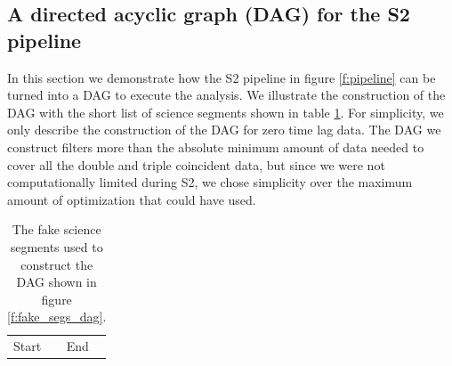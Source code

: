 \subsection{A directed acyclic graph (DAG) for the S2 pipeline}
\label{ss:dag}

In this section we demonstrate how the S2 pipeline in figure \ref{f:pipeline}
can be turned into a DAG to execute the analysis. We illustrate the
construction of the DAG with the short list of science segments shown in table
\ref{t:fakesegslist}. For simplicity, we only describe the construction of the
DAG for zero time lag data. The DAG we construct filters more than the
absolute minimum amount of data needed to cover all the double and triple
coincident data, but since we were not computationally limited during S2, we
chose simplicity over the maximum amount of optimization that could have used.

\begin{table}[h]
\begin{center}
\begin{tabular}{ll}
Start&End
\end{tabular}
\end{center}
\caption{\label{t:fakesegslist}%
The fake science segments used to construct the DAG shown in figure
\ref{f:fake_segs_dag}.
}
\end{table}

